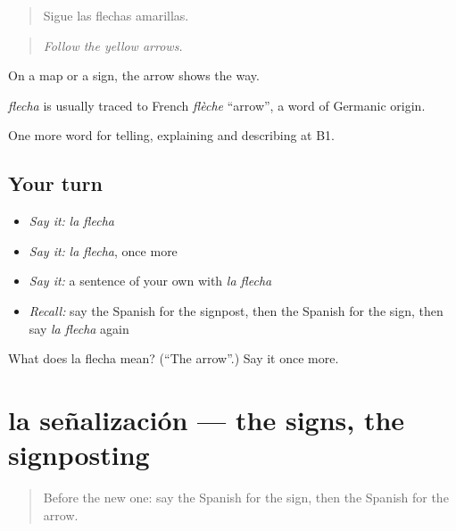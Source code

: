 \begin{quote}
Sigue las flechas amarillas.
\end{quote}

\begin{quote}
\emph{Follow the yellow arrows.}
\end{quote}

On a map or a sign, the arrow shows the way.

\begin{cousinweb}
\emph{flecha} is usually traced to French \emph{flèche} \textquotedblleft{}arrow\textquotedblright{}, a word of Germanic origin.
\end{cousinweb}

\begin{grammarlens}[title={What you've built}]
One more word for telling, explaining and describing at B1.
\end{grammarlens}

\subsection*{Your turn}
\begin{itemize}
\raggedright
  \item \emph{Say it:} \emph{la flecha}
  \item \emph{Say it:} \emph{la flecha}, once more
  \item \emph{Say it:} a sentence of your own with \emph{la flecha}
  \item \emph{Recall:} say the Spanish for the signpost, then the Spanish for the sign, then say \emph{la flecha} again
\end{itemize}

\begin{tcolorbox}[breakable,colback=teal!4,colframe=teal!35!black,title={Before you move on}]
What does la flecha mean? (\textquotedblleft{}The arrow\textquotedblright{}.) Say it once more.
\end{tcolorbox}
\section[la señalización]{la señalización — the signs, the signposting}

\label{lesson:ES-C672-senalizacion}



\begin{quote}
Before the new one: say the Spanish for the sign, then the Spanish for the arrow.
\end{quote}

